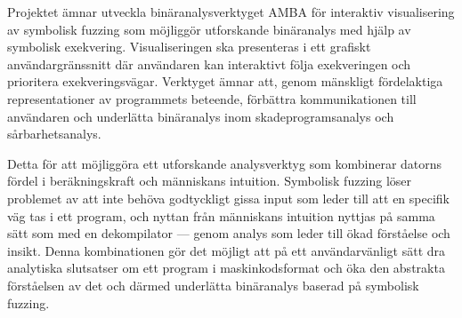 
Projektet ämnar utveckla binäranalysverktyget AMBA för interaktiv visualisering
av symbolisk fuzzing som möjliggör utforskande binäranalys med hjälp av
symbolisk exekvering. Visualiseringen ska presenteras i ett grafiskt
användargränssnitt där användaren kan interaktivt följa exekveringen och
prioritera exekveringsvägar. Verktyget ämnar att, genom mänskligt fördelaktiga
representationer av programmets beteende, förbättra kommunikationen till
användaren och underlätta binäranalys inom skadeprogramsanalys och
sårbarhetsanalys.

Detta för att möjliggöra ett utforskande analysverktyg som kombinerar datorns
fördel i beräkningskraft och människans intuition. Symbolisk fuzzing löser
problemet av att inte behöva godtyckligt gissa input som leder till att en
specifik väg tas i ett program, och nyttan från människans intuition nyttjas på
samma sätt som med en dekompilator --- genom analys som leder till ökad
förståelse och insikt. Denna kombinationen gör det möjligt att på ett
användarvänligt sätt dra analytiska slutsatser om ett program i
maskinkodsformat och öka den abstrakta förståelsen av det och därmed underlätta
binäranalys baserad på symbolisk fuzzing.
